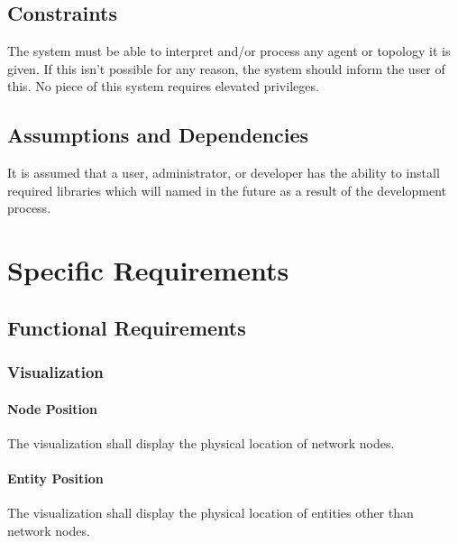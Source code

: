 \documentclass[titlepage]{article}
\begin{document}
\subsection{Constraints%
  \label{constraints}%
}

The system must be able to interpret and/or process any agent or topology it is given.  If this isn't possible for any reason, the system should inform the user of this. No piece of this system requires elevated privileges.


\subsection{Assumptions and Dependencies%
  \label{assumptions-and-dependencies}%
}

It is assumed that a user, administrator, or developer has the ability to install required libraries which will named in the future as a result of the development process.


\section{Specific Requirements%
  \label{specific-requirements}%
}

\subsection{Functional Requirements%
    \label{functional}%
}

\subsubsection{Visualization}
\paragraph{Node Position} The visualization shall display the physical location of network nodes.
\paragraph{Entity Position} The visualization shall display the physical location of entities other than network nodes.
\end{document}
